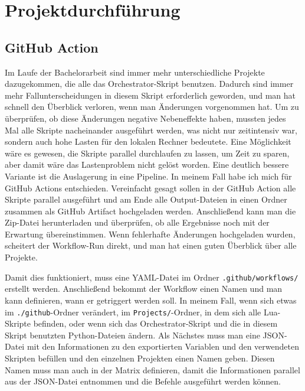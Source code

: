 \chapter{Projektdurchführung}\label{ch:projektdurchfuhrung}

\section{GitHub Action}\label{sec:github-action}

Im Laufe der Bachelorarbeit sind immer mehr unterschiedliche Projekte dazugekommen, die alle das Orchestrator-Skript benutzen.
Dadurch sind immer mehr Fallunterscheidungen in diesem Skript erforderlich geworden, und man hat schnell den Überblick verloren, wenn man Änderungen vorgenommen hat.
Um zu überprüfen, ob diese Änderungen negative Nebeneffekte haben, mussten jedes Mal alle Skripte nacheinander ausgeführt werden, was nicht nur zeitintensiv war, sondern auch hohe Lasten für den lokalen Rechner bedeutete.
Eine Möglichkeit wäre es gewesen, die Skripte parallel durchlaufen zu lassen, um Zeit zu sparen, aber damit wäre das Lastenproblem nicht gelöst worden.
Eine deutlich bessere Variante ist die Auslagerung in eine Pipeline.
In meinem Fall habe ich mich für GitHub Actions entschieden.
Vereinfacht gesagt sollen in der GitHub Action alle Skripte parallel ausgeführt und am Ende alle Output-Dateien in einen Ordner zusammen als GitHub Artifact hochgeladen werden.
Anschließend kann man die Zip-Datei herunterladen und überprüfen, ob alle Ergebnisse noch mit der Erwartung übereinstimmen.
Wenn fehlerhafte Änderungen hochgeladen wurden, scheitert der Workflow-Run direkt, und man hat einen guten Überblick über alle Projekte.

Damit dies funktioniert, muss eine YAML-Datei im Ordner \texttt{.github/workflows/} erstellt werden.
Anschließend bekommt der Workflow einen Namen und man kann definieren, wann er getriggert werden soll.
In meinem Fall, wenn sich etwas im \texttt{./github}-Ordner verändert, im \texttt{Projects/}-Ordner, in dem sich alle Lua-Skripte befinden, oder wenn sich das Orchestrator-Skript und die in diesem Skript benutzten Python-Dateien ändern.
Als Nächstes muss man eine JSON-Datei mit den Informationen zu den exportierten Variablen und den verwendeten Skripten befüllen und den einzelnen Projekten einen Namen geben.
Diesen Namen muss man auch in der Matrix definieren, damit die Informationen parallel aus der JSON-Datei entnommen und die Befehle ausgeführt werden können.

